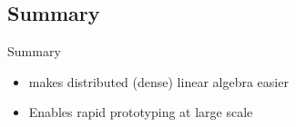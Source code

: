 \subsection{Summary}
\makesubcontentsslidessec


\begin{frame}
  \begin{block}{Summary}
    \begin{itemize}
      \item {} makes distributed (dense) linear algebra easier
      \item Enables rapid prototyping at large scale
    \end{itemize}
  \end{block}
\end{frame}